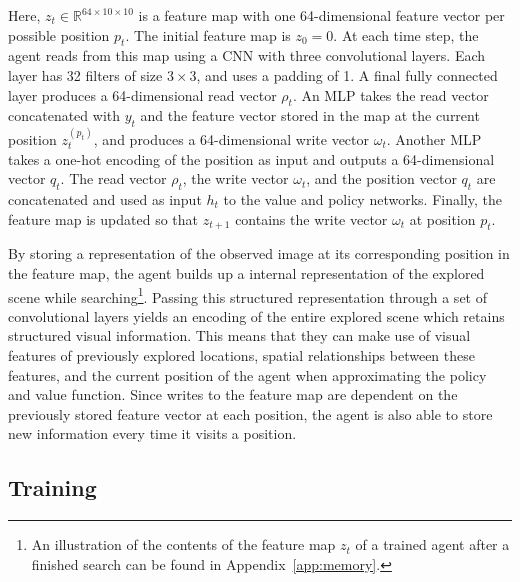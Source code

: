 Here, \(z_t \in \mathbb{R}^{64 \times 10 \times 10}\) is a feature map with one 64-dimensional feature vector per possible position \(p_t\).
The initial feature map is \(z_0 = 0\).
At each time step, the agent reads from this map using a CNN with three convolutional layers.
Each layer has 32 filters of size \(3 \times 3\), and uses a padding of 1.
A final fully connected layer produces a 64-dimensional read vector \(\rho_t\).
An MLP takes the read vector concatenated with \(y_t\) and the feature vector stored in the map at the current position \(z_t^{(p_t)}\), and produces a 64-dimensional write vector \(\omega_{t}\).
Another MLP takes a one-hot encoding of the position as input and outputs a 64-dimensional vector \(q_t\).
The read vector \(\rho_t\), the write vector \(\omega_{t}\), and the position vector \(q_t\) are concatenated and used as input \(h_t\) to the value and policy networks.
Finally, the feature map is updated so that \(z_{t+1}\) contains the write vector \(\omega_{t}\) at position \(p_t\).

By storing a representation of the observed image at its corresponding position in the feature map, the agent builds up a internal representation of the explored scene while searching\footnote{An illustration of the contents of the feature map \(z_t\) of a trained agent after a finished search can be found in Appendix~\ref{app:memory}.}.
Passing this structured representation through a set of convolutional layers yields an encoding of the entire explored scene which retains structured visual information.
This means that they can make use of visual features of previously explored locations, spatial relationships between these features, and the current position of the agent when approximating the policy and value function.
Since writes to the feature map are dependent on the previously stored feature vector at each position, the agent is also able to store new information every time it visits a position.


\subsection{Training}

